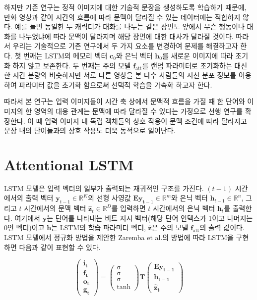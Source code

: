 \documentclass{kcc}
\newcommand{\vy}[0]{\mathbf{y}}
\newcommand{\vc}[0]{\mathbf{c}}
\newcommand{\vh}[0]{\mathbf{h}}
\newcommand{\vt}[0]{\mathbf{t}}
\newcommand{\vz}[0]{\mathbf{z}}
\newcommand{\mE}[0]{\mathbf{E}}
\begin{document}
하지만 기존 연구는 정적 이미지에 대한 기술적 문장을 생성하도록 학습하기 때문에, 만화 영상과 같이 시간의 흐름에 따라 문맥이 달라질 수 있는 데이터에는 적합하지 않다. 예를 들면 동일한 두 캐릭터가 대화를 나누는 같은 장면도 앞에서 무슨 행동이나 대화를 나누었냐에 따라 문맥이 달라지며 해당 장면에 대한 대사가 달라질 것이다. 따라서 우리는 기술적으로 기존 연구에서 두 가지 요소를 변경하여 문제를 해결하고자 한다. 첫 번째는 LSTM의 메모리 벡터 $\vc_0$와 은닉 벡터 $\vh_0$를 새로운 이미지에 따라 초기화 하지 않고 보존한다. 두 번째는 주의 모델 $\mathbf{f}_{\text{att}}$를 랜덤 파라미터로 초기화하는 대신 한 시간 분량의 비슷하지만 서로 다른 영상을 본 다수 사람들의 시선 분포 정보를 이용하여 파라미터 값을 초기화 함으로써 선택적 학습을 가속화 하고자 한다.  

따라서 본 연구는 입력 이미지들이 시간 축 상에서 문맥적 흐름을 가질 때 한 단어와 이미지의 한 영역의 대응 관계는 문맥에 따라 달라질 수 있다는 가정으로 선행 연구를 확장한다. 이 때 입력 이미지 내 독립 객체들의 상호 작용이 문맥 조건에 따라 달라지고 문장 내의 단어들과의 상호 작용도 더욱 동적으로 일어난다. 

\section{Attentional LSTM}

LSTM 모델은 입력 벡터의 일부가 출력되는 재귀적인 구조를 가진다. $(t-1)$ 시간에서의 출력 벡터 $\vy_{t-1} \in \mathbb{R}^K$의 선형 사영값 $\mE\vy_{\vt-1} \in \mathbb{R}^m$와 은닉 벡터 $\vh_{t-1} \in \mathbb{R}^n$, 그리고 $t$ 시간에서의 문맥 벡터 $\hat{\vz}_t \in \mathbb{R}^D$를 입력하면 $t$ 시간에서의 은닉 벡터 $\vh_t$를 출력한다. 여기에서 $\vy$는 단어를 나타내는 비트 지시 벡터(해당 단어 인덱스가 1이고 나머지는 0인 벡터)이고 $\vh$는 LSTM의 학습 파라미터 벡터, $\hat{\vz}$은 주의 모델 $\mathbf{f}_{\text{att}}$의 출력 값이다. LSTM 모델에서 정규화 방법을 제안한 Zaremba et al.\cite{Zaremba2015}의 방법에 따라 LSTM을 구현하면 다음과 같이 표현할 수 있다.

\begin{equation}
\begin{pmatrix}\mathbf{i_{t}}\\\mathbf{f_{t}}\\\mathbf{o_{t}}\\\mathbf{g_{t}}\end{pmatrix} =
  \begin{pmatrix}\mathrm{\sigma}\\\mathrm{\sigma}\\\mathrm{\sigma}\\\tanh\end{pmatrix}
  \mathbf{T}
  \begin{pmatrix}\mathbf{Ey_{t-1}}\\\mathbf{h_{t-1}}\\\mathbf{\hat{z}_t}\end{pmatrix}
\end{equation}
\end{document}
